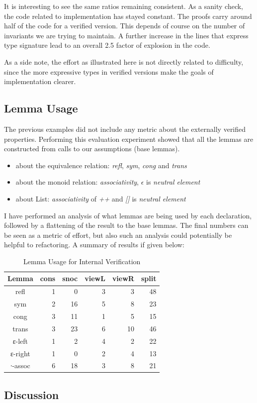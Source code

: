 \documentclass[12pt,twoside,notitlepage]{report}
\begin{document}
It is interesting to see the same ratios remaining consistent. As a sanity check, the code related to implementation has stayed constant. The proofs carry around half of the code for a verified version. This depends of course on the number of invariants we are trying to maintain. A further increase in the lines that express type signature lead to an overall 2.5 factor of explosion in the code.

As a side note, the effort as illustrated here is not directly related to difficulty, since the more expressive types in verified versions make the goals of implementation clearer.

\subsection{Lemma Usage}

The previous examples did not include any metric about the externally verified properties. 
Performing this evaluation experiment showed that all the lemmas are constructed from calls to our assumptions (base lemmas).

\begin{itemize}
\item about the equivalence relation: \textit{refl}, \textit{sym}, \textit{cong} and \textit{trans}
\item about the monoid relation: \textit{associativity}, $\epsilon$ is \textit{neutral element}
\item about List: \textit{associativity} of \textit{++} and \textit{[]} is \textit{neutral element}
\end{itemize} 

I have performed an analysis of what lemmas are being used by each declaration, followed by a flattening of the result to the base lemmas. The final numbers can be seen as a metric of effort, but also such an analysis could potentially be helpful to refactoring. A summary of results if given below:

\begin{table}[H]
\caption{Lemma Usage for Internal Verification}
\center
\begin{tabular}{c r r r r r}
\hline 
Lemma & cons & snoc & viewL & viewR & split \\
\hline
refl  	&	1	&	0	&	3&	3&  48\\
sym     &	2	&	16	&	5&	8&	23\\
cong   	&	3	&	11	&	1&	5&	15\\
trans  	&	3	&	23	&	6&	10& 46\\
ε-left  &	1	&	2	&	4&	2& 22\\  
ε-right &	1	&	0	&	2&	4& 13\\
∙-assoc &	6	&	18	&	3&	8& 21\\
\hline
\end{tabular}
\end{table} 


\subsection{Discussion}









 
\end{document}
